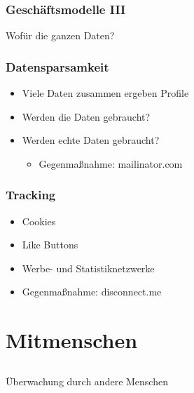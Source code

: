 \documentclass[12pt]{beamer}
\begin{document}
\begin{frame}
    \frametitle{Geschäftsmodelle III}
    \begin{center} \Large
        Wofür die ganzen Daten?
    \end{center}
\end{frame}

\begin{frame}
    \frametitle{Datensparsamkeit}
    \begin{itemize}
        \item<2-> Viele Daten zusammen ergeben Profile
        \item<3-> Werden die Daten gebraucht?
        \item<4-> Werden echte Daten gebraucht?
            \begin{itemize}
                \item<5-> Gegenmaßnahme: mailinator.com
            \end{itemize}
    \end{itemize}
\end{frame}

\begin{frame}
    \frametitle{Tracking}
    \begin{itemize}
        \item<2-> Cookies
        \item<3-> Like Buttons
        \item<4-> Werbe- und Statistiknetzwerke
        \item<5-> Gegenmaßnahme: disconnect.me
    \end{itemize}
\end{frame}

\section{Mitmenschen}
\subsection{}

\begin{frame}
  \begin{center}\Large
    Überwachung durch andere Menschen
  \end{center}
\end{frame}
\end{document}
